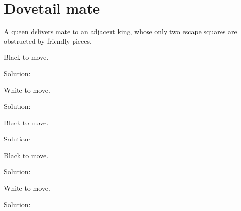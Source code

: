 \documentclass{book}
\begin{document}
\section{Dovetail mate}
A queen delivers mate to an adjacent king, whose only two escape squares are obstructed by friendly pieces.\begin{multicols}{2} 
\begin{samepage} 
\newgame 


 
\showboard
 
 Black to move. 
 
Solution: 
 
\end{samepage}\begin{samepage} 
\newgame 


 
\showboard
 
 White to move. 
 
Solution: 
 
\end{samepage}\begin{samepage} 
\newgame 


 
\showboard
 
 Black to move. 
 
Solution: 
 
\end{samepage}\begin{samepage} 
\newgame 


 
\showboard
 
 Black to move. 
 
Solution: 
 
\end{samepage}\begin{samepage} 
\newgame 


 
\showboard
 
 White to move. 
 
Solution: 
 
\end{samepage}\end{multicols} 
\newpage 
\end{document}
